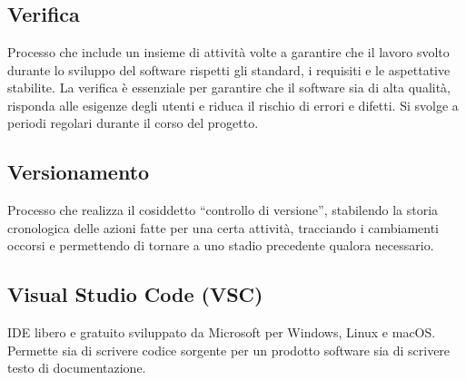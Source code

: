\newpage



\section{}

\hypertarget{sec:verifica}{}
\subsection*{Verifica}
Processo che include un insieme di attività volte a garantire che il lavoro svolto durante lo sviluppo del software rispetti gli standard, i requisiti e 
le aspettative stabilite. La verifica è essenziale per garantire che il software sia di alta qualità, risponda alle esigenze degli utenti e riduca il 
rischio di errori e difetti. Si svolge a periodi regolari durante il corso del progetto.

\subsection*{Versionamento}
Processo che realizza il cosiddetto “controllo di versione”, stabilendo la storia cronologica delle azioni fatte per una certa attività, tracciando i 
cambiamenti occorsi e permettendo di tornare a uno stadio precedente qualora necessario.

\hypertarget{sec:VSC}{}
\subsection*{Visual Studio Code (VSC)}
IDE libero e gratuito sviluppato da Microsoft per Windows, Linux e macOS. Permette sia di scrivere codice 
sorgente per un prodotto software sia di scrivere testo di documentazione.

\newpage